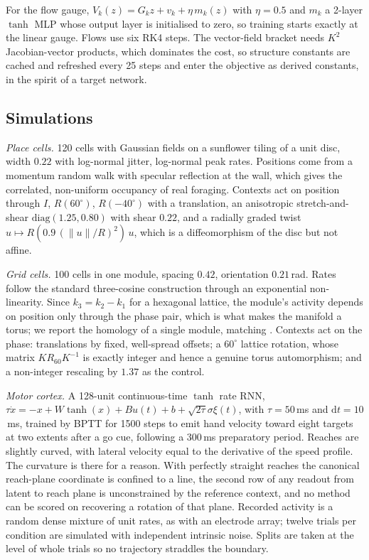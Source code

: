 For the flow gauge, $V_k(z)=G_kz+v_k+\eta\,m_k(z)$ with $\eta=0.5$ and $m_k$ a
2-layer $\tanh$ MLP whose output layer is initialised to zero, so training starts
exactly at the linear gauge. Flows use six RK4 steps. The vector-field bracket
needs $K^2$ Jacobian-vector products, which dominates the cost, so structure
constants are cached and refreshed every 25 steps and enter the objective as
derived constants, in the spirit of a target network.

\subsection{Simulations}

\textit{Place cells.} 120 cells with Gaussian fields on a sunflower tiling of a
unit disc, width $0.22$ with log-normal jitter, log-normal peak rates. Positions
come from a momentum random walk with specular reflection at the wall, which
gives the correlated, non-uniform occupancy of real foraging. Contexts act on
position through $I$, $R(60^\circ)$, $R(-40^\circ)$ with a translation, an
anisotropic stretch-and-shear $\mathrm{diag}(1.25,0.80)$ with shear $0.22$, and a
radially graded twist $u \mapsto R(0.9\,(\|u\|/R)^2)\,u$, which is a
diffeomorphism of the disc but not affine.

\textit{Grid cells.} 100 cells in one module, spacing $0.42$, orientation
$0.21$\,rad. Rates follow the standard three-cosine construction through an
exponential non-linearity. Since $k_3 = k_2-k_1$ for a hexagonal lattice, the
module's activity depends on position only through the phase pair, which is what
makes the manifold a torus; we report the homology of a single module, matching
\citet{gardner2022toroidal}. Contexts act on the phase: translations by fixed,
well-spread offsets; a $60^\circ$ lattice rotation, whose matrix
$K R_{60}K^{-1}$ is exactly integer and hence a genuine torus automorphism; and a
non-integer rescaling by $1.37$ as the control.

\textit{Motor cortex.} A 128-unit continuous-time $\tanh$ rate RNN,
$\tau\dot x = -x + W\tanh(x) + Bu(t) + b + \sqrt{2\tau}\sigma\xi(t)$, with
$\tau=50$\,ms and $\mathrm{d}t=10$\,ms, trained by BPTT for 1500 steps to emit
hand velocity toward eight targets at two extents after a go cue, following a
300\,ms preparatory period. Reaches are slightly curved, with lateral velocity
equal to the derivative of the speed profile. The curvature is there for a
reason. With perfectly straight reaches the canonical reach-plane coordinate is
confined to a line, the second row of any readout from latent to reach plane is unconstrained
by the reference context, and no method can be scored on recovering a rotation of
that plane. Recorded activity is a random dense mixture of unit rates, as with an
electrode array; twelve trials per condition are simulated with independent
intrinsic noise. Splits are taken at the level of whole trials so no trajectory
straddles the boundary.

